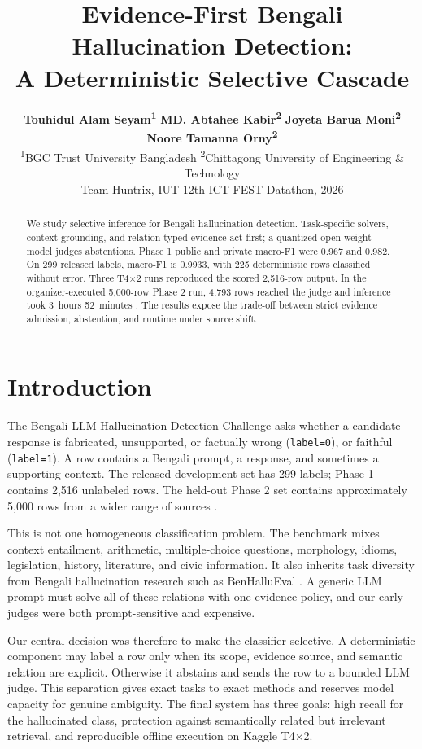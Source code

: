 \documentclass[11pt]{article}
\title{Evidence-First Bengali Hallucination Detection:\\
A Deterministic Selective Cascade}
\author{
  \textbf{Touhidul Alam Seyam\textsuperscript{1}} \quad
  \textbf{MD. Abtahee Kabir\textsuperscript{2}} \quad
  \textbf{Joyeta Barua Moni\textsuperscript{2}} \\
  \textbf{Noore Tamanna Orny\textsuperscript{2}} \\
  \textsuperscript{1}BGC Trust University Bangladesh \quad
  \textsuperscript{2}Chittagong University of Engineering \& Technology \\
  Team Huntrix, IUT 12th ICT FEST Datathon, 2026
}
\newcommand{\labelzero}{\texttt{label=0}}
\newcommand{\labelone}{\texttt{label=1}}
\begin{document}
\maketitle

\begin{abstract}
We study selective inference for Bengali hallucination detection. Task-specific solvers, context grounding, and relation-typed evidence act first; a quantized open-weight model judges abstentions. Phase 1 public and private macro-F1 were 0.967 and 0.982. On 299 released labels, macro-F1 is 0.9933, with 225 deterministic rows classified without error. Three T4$\times$2 runs reproduced the scored 2,516-row output. In the organizer-executed 5,000-row Phase 2 run, 4,793 rows reached the judge and inference took 3~hours 52~minutes \citep{phase2run}. The results expose the trade-off between strict evidence admission, abstention, and runtime under source shift.
\end{abstract}

\section{Introduction}

The Bengali LLM Hallucination Detection Challenge asks whether a candidate response is fabricated, unsupported, or factually wrong (\labelzero), or faithful (\labelone). A row contains a Bengali prompt, a response, and sometimes a supporting context. The released development set has 299 labels; Phase 1 contains 2,516 unlabeled rows. The held-out Phase 2 set contains approximately 5,000 rows from a wider range of sources \citep{competition,phase2}.

This is not one homogeneous classification problem. The benchmark mixes context entailment, arithmetic, multiple-choice questions, morphology, idioms, legislation, history, literature, and civic information. It also inherits task diversity from Bengali hallucination research such as BenHalluEval \citep{benhallu}. A generic LLM prompt must solve all of these relations with one evidence policy, and our early judges were both prompt-sensitive and expensive.

Our central decision was therefore to make the classifier selective. A deterministic component may label a row only when its scope, evidence source, and semantic relation are explicit. Otherwise it abstains and sends the row to a bounded LLM judge. This separation gives exact tasks to exact methods and reserves model capacity for genuine ambiguity. The final system has three goals: high recall for the hallucinated class, protection against semantically related but irrelevant retrieval, and reproducible offline execution on Kaggle T4$\times$2.
\end{document}

